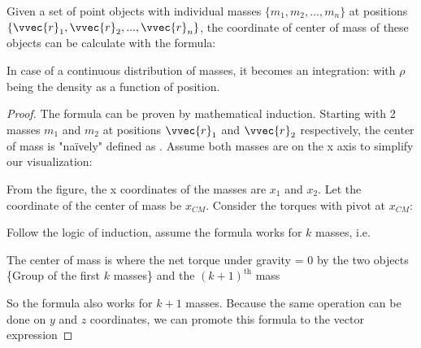 \documentclass[class=article, crop=false, 12pt]{standalone}
\begin{document}
Given a set of point objects with individual masses $\{m_1, m_2, ..., m_n\}$ at positions $\{\vvec{r}_1, \vvec{r}_2, ..., \vvec{r}_n\}$,
the coordinate of center of mass of these objects can be calculate with the formula:

In case of a continuous distribution of masses, it becomes an integration:
with $\rho$ being the density as a function of position.

\begin{proof}
The formula can be proven by mathematical induction. Starting with 2 masses $m_1$ and $m_2$ at positions $\vvec{r}_1$ and $\vvec{r}_2$ respectively,
the center of mass is "naïvely" defined as . 
Assume both masses are on the x axis to simplify our visualization:


From the figure, the x coordinates of the masses are $x_1$ and $x_2$. Let the coordinate of the center of mass be $x_{CM}$.
Consider the torques with pivot at $x_{CM}$:

Follow the logic of induction, assume the formula works for $k$ masses, i.e. 

The center of mass is where the net torque under gravity = 0 by the two objects \{Group of the first $k$ masses\} and the $(k+1)^\text{th}$ mass

So the formula also works for $k+1$ masses. 
Because the same operation can be done on $y$ and $z$ coordinates, we can promote this formula to the vector expression

\end{proof}
\end{document}
